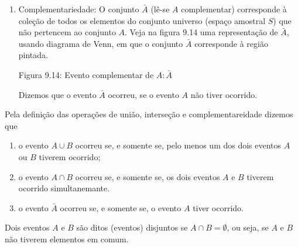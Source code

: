 \begin{enumerate}
\item {} 
Complementariedade: O conjunto \(\bar{A}\) (lê-se \(A\) complementar) corresponde à coleção de todos os elementos do conjunto universo (espaço amostral \(S\)) que não pertencem ao conjunto \(A\). Veja na figura 9.14 uma representação de \(\bar{A}\), usando diagrama de Venn, em que o conjunto \(\bar{A}\) corresponde à região pintada.
\begin{quote}
\begin{center}\end{center}\end{quote}

Figura 9.14: Evento complementar de \(A: \bar{A}\)

Dizemos que o evento \(\bar{A}\) ocorreu, se o evento \(A\) não tiver ocorrido.

\end{enumerate}

Pela definição das operações de união, interseção e complementareidade dizemos que
\begin{enumerate}
\item {} 
o evento \(A\cup B\)  ocorreu se, e somente se, pelo menos um dos dois eventos \(A\) ou \(B\) tiverem ocorrido;

\item {} 
o evento \(A\cap B\) ocorreu se, e somente se, os dois eventos \(A\) e \(B\) tiverem ocorrido simultanemante.

\item {} 
o evento \(\bar{A}\) ocorreu se, e somente se, o evento \(A\)  tiver ocorrido.

\end{enumerate}
\begin{description}
\item[{Dois eventos \(A\)  e \(B\) são ditos (eventos) disjuntos se \(A\cap B=\emptyset\), ou seja, se \(A\) e \(B\) não tiverem elementos em comum.}] \leavevmode{}\label{\detokenize{PE511-1:term-dois-eventos-e-sao-ditos-eventos-disjuntos-se-ou-seja-se-e-nao-tiverem-elementos-em-comum}}
\end{description}

